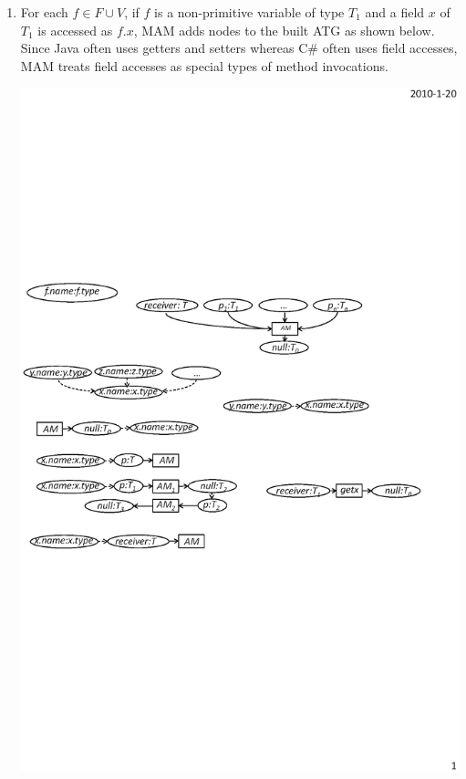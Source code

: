 \begin{enumerate}
\item For each $f\in F \cup V$, if $f$ is a non-primitive variable
of type $T_1$ and a field $x$ of $T_1$ is accessed as $f.x$, MAM adds nodes to the built ATG as shown below. Since Java often
uses getters and setters whereas C\# often uses field accesses, MAM treats field accesses as special types of method
invocations. \vspace*{-2ex}

\begin{center}
\includegraphics[scale=0.7,clip]{figure/rule3.eps}%
\end{center}\vspace*{-4ex}


\end{enumerate}
